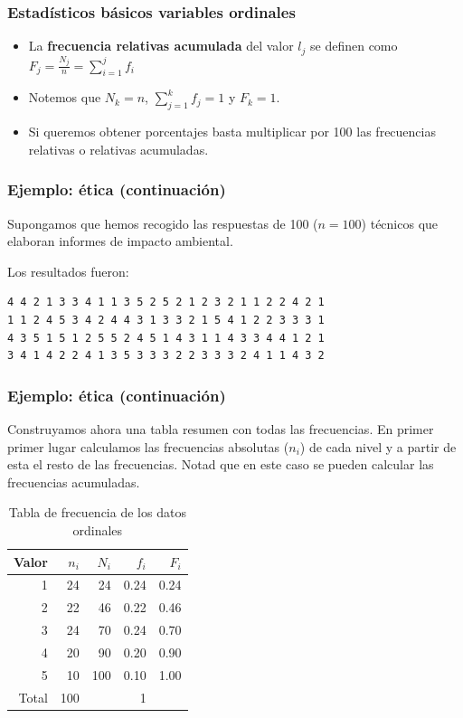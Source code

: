 \begin{frame}
\frametitle{Estadísticos básicos variables ordinales}
\begin{itemize}

\item La \textbf{frecuencia relativas acumulada} del valor $l_j$ se definen como $F_j=\frac{N_j}{n}=\sum_{i=1}^j f_i$
\item Notemos que $N_k=n$, $\sum_{j=1}^k f_j=1$ y $F_k=1$.
\item Si queremos obtener porcentajes basta multiplicar por 100 las frecuencias relativas o relativas acumuladas.
\end{itemize}
\end{frame}

\begin{frame}[fragile]
\frametitle{Ejemplo: ética (continuación)}
Supongamos que hemos recogido las respuestas de 100 ($n=100$) técnicos que elaboran informes de impacto ambiental.

Los resultados fueron:
\begin{verbatim}
4 4 2 1 3 3 4 1 1 3 5 2 5 2 1 2 3 2 1 1 2 2 4 2 1
1 1 2 4 5 3 4 2 4 4 3 1 3 3 2 1 5 4 1 2 2 3 3 3 1 
4 3 5 1 5 1 2 5 5 2 4 5 1 4 3 1 1 4 3 3 4 4 1 2 1 
3 4 1 4 2 2 4 1 3 5 3 3 3 2 2 3 3 3 2 4 1 1 4 3 2
\end{verbatim}
\end{frame} 

\begin{frame}
\frametitle{Ejemplo: ética (continuación)}

Construyamos ahora una tabla resumen con todas las frecuencias. En primer primer lugar calculamos las frecuencias absolutas ($n_i$) de cada nivel y a partir de esta el resto de las frecuencias. Notad que en este caso se pueden calcular las frecuencias acumuladas.

\begin{table}[ht]
\begin{center}
\begin{tabular}{rrrrr}
  \hline
Valor & $n_i$ & $N_i$ & $f_i$ & $F_i$ \\ 
  \hline
1 &  24 &  24 & 0.24 & 0.24 \\ 
  2 &  22 &  46 & 0.22 & 0.46 \\ 
  3 &  24 &  70 & 0.24 & 0.70 \\ 
  4 &  20 &  90 & 0.20 & 0.90 \\ 
  5 &  10 & 100 & 0.10 & 1.00 \\ 
   \hline
Total & 100 & & 1 & \\\hline
\end{tabular}
\end{center}
\caption{Tabla de frecuencia de los datos ordinales}
\end{table}
 
\end{frame}

